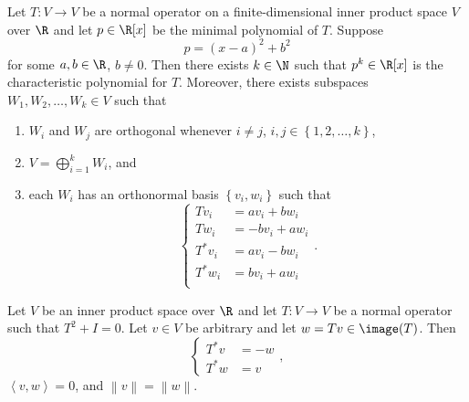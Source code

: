\documentclass[linearalgebraII]{subfiles}
\begin{document}
    \begin{prop}{}
        Let $T:V\to V$ be a normal operator on a finite-dimensional inner product space $V$ over $\R$ and let $p\in\R[x]$ be the minimal polynomial of $T$. Suppose
        \begin{equation*}
            p = (x-a)^2 + b^2
        \end{equation*}
        for some $a,b\in\R$, $b\neq 0$. Then there exists $k\in\N$ such that $p^k\in\R[x]$ is the characteristic polynomial for $T$. Moreover, there exists subspaces $W_1,W_2,\ldots,W_k\in V$ such that
        \begin{enumerate}
            \item $W_i$ and $W_j$ are orthogonal whenever $i\neq j$, $i,j\in\left\lbrace 1,2,\ldots,k \right\rbrace$,
            \item $V=\bigoplus^{k}_{i=1} W_i$, and
            \item each $W_i$ has an orthonormal basis $\left\lbrace v_i,w_i \right\rbrace$ such that
                \begin{equation*}
                    \begin{cases} 
                        Tv_i & = av_i + bw_i \\
                        Tw_i & = -bv_i + aw_i \\
                        T^{*} v_i & = av_i - bw_i \\
                        T^{*} w_i & = bv_i + aw_i \\
                    \end{cases}.
                \end{equation*}
        \end{enumerate}
    \end{prop}

    \begin{lemma_inside}{}
        Let $V$ be an inner product space over $\R$ and let $T:V\to V$ be a normal operator such that $T^2+I = 0$. Let $v\in V$ be arbitrary and let $w=Tv\in\image(T)$. Then
        \begin{equation*}
            \begin{cases} 
                T^{*} v & = -w \\
                T^{*} w & = v
            \end{cases},
        \end{equation*}
        $\left\langle v, w\right\rangle = 0$, and $\left\lVert v\right\rVert = \left\lVert w\right\rVert$.
    \end{lemma_inside}
\end{document}
